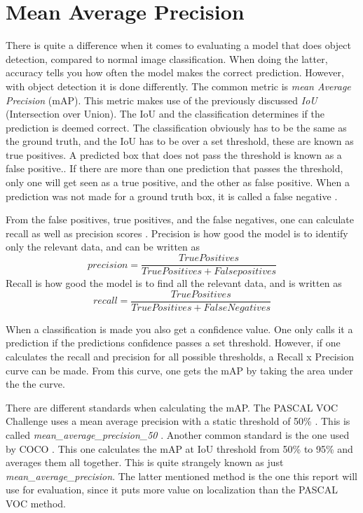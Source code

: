 \section{Mean Average Precision}

There is quite a difference when it comes to evaluating a model that does object detection,  compared to normal image classification. When doing the latter, accuracy tells you how often the model makes the correct prediction. However, with object detection it is done differently. The common metric is \textit{mean Average Precision} (mAP).  This metric makes use of the previously discussed \textit{IoU} (Intersection over Union). The IoU and the classification determines if the prediction is deemed correct. The classification obviously has to be the same as the ground truth, and the IoU has to be over a set threshold, these are known as true positives. A predicted box that does not pass the threshold is known as a false positive.. If there are more than one prediction that passes the threshold, only one will get seen as a true positive, and the other as false positive. When a prediction was not made for a ground truth box, it is called a false negative \cite{turiAdvanced}.

From the false positives, true positives, and the false negatives, one can calculate recall as well as precision scores \cite{rafaelpadilla}.  Precision is how good the model is to identify only the relevant data, and can be written as
\[ precision = \frac{True Positives}{True Positives + False positives }\]
Recall is how good the model is to find all the relevant data, and is written as 
\[ recall = \frac{True Positives}{True Positives +False Negatives }\]

 When a classification is made you also get a confidence value. One only calls it a prediction if the predictions confidence passes a set threshold. However, if one calculates the recall and precision for all possible thresholds, a Recall x Precision curve can be made. From this curve, one gets the mAP by taking the area under the the curve.

There are different standards when calculating the mAP. The PASCAL VOC Challenge uses a mean average precision with a static threshold of 50\%
 \cite{PASCAL}. This is called   \textit{mean\_average\_precision\_50} . Another common standard is the one used by COCO  \cite{COCO}. This one calculates the mAP at IoU threshold from 50\%  to 95\%  and averages them all together. This is quite strangely known as just \textit{mean\_average\_precision}. The latter mentioned method is the one this report will use for evaluation, since it puts more value on localization than the PASCAL VOC method.

